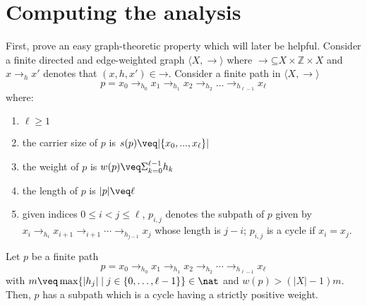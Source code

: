 \section{Computing the analysis} 
\label{sec:computing}

First, prove an easy graph-theoretic property which will later be
helpful.
Consider a finite directed and edge-weighted graph
\(\langle X,\to\rangle\) where
\(\to \mathord{\subseteq} X \times \mathbb{Z} \times X\) and
\(x \to_h x'\) denotes that \((x, h, x') \in \mathbin{\to}\). Consider
a finite path in \(\langle X,\to\rangle\)
\[p= x_0 \to_{h_0} x_1 \to_{h_1} x_2 \to_{h_2} \ldots \to_{h_{\ell-1}}
  x_{\ell}\] where:
\begin{enumerate}[label=(\roman*).]
\item \(\ell\geq 1\)
\item the carrier size of \(p\) is \(s(p) \veq |\{x_0,...,x_\ell\}|\)
\item the weight of \(p\) is \(w(p) \veq \Sigma_{k=0}^{\ell-1} h_k\)
\item the length of \(p\) is \(|p|\veq \ell\)
\item given indices \(0 \leq i < j \leq \ell\), \(p_{i,j}\) denotes
  the subpath of \(p\) given by
  \(x_i \to_{h_i} x_{i+1} \to_{i+1} \cdots \to_{h_{j-1}} x_j\) whose
  length is \(j-i\); \(p_{i,j}\) is a cycle if \(x_i=x_j\).
\end{enumerate}

\begin{lemma}
  \label{le:cycles}
  Let \(p\) be a finite path
  \[p = x_0 \to_{h_0} x_1 \to_{h_1} x_2 \to_{h_2} \cdots \to_{h_{\ell-1}} x_{\ell}\]
  with
  \(m \veq \max \{ |h_j| \mid j \in \{0, \ldots, \ell-1\}\}\in \nat\) and 
  \(w(p) > (|X|-1)m\). Then, \(p\) has a subpath which is a cycle having a 
  strictly positive weight.
\end{lemma}

